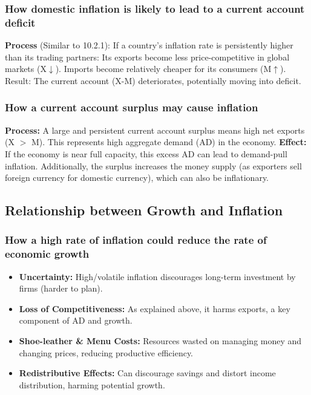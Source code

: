 \documentclass[11pt, a4paper, twoside]{book}
\begin{document}
\subsubsection{How domestic inflation is likely to lead to a current account deficit}

\textbf{Process} (Similar to 10.2.1): If a country's inflation rate is persistently higher than its trading partners: Its exports become less price-competitive in global markets (X$\downarrow$). Imports become relatively cheaper for its consumers (M$\uparrow$). Result: The current account (X-M) deteriorates, potentially moving into deficit.

\subsubsection{How a current account surplus may cause inflation}

\textbf{Process:} A large and persistent current account surplus means high net exports (X $>$ M). This represents high aggregate demand (AD) in the economy. \textbf{Effect:} If the economy is near full capacity, this excess AD can lead to demand-pull inflation. Additionally, the surplus increases the money supply (as exporters sell foreign currency for domestic currency), which can also be inflationary.

\subsection{Relationship between Growth and Inflation}

\subsubsection{How a high rate of inflation could reduce the rate of economic growth}

\begin{itemize}
  \item \textbf{Uncertainty:} High/volatile inflation discourages long-term investment by firms (harder to plan).
  \item \textbf{Loss of Competitiveness:} As explained above, it harms exports, a key component of AD and growth.
  \item \textbf{Shoe-leather \& Menu Costs:} Resources wasted on managing money and changing prices, reducing productive efficiency.
  \item \textbf{Redistributive Effects:} Can discourage savings and distort income distribution, harming potential growth.
\end{itemize}
\end{document}
